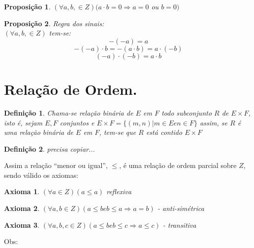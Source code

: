 \documentclass[a4paper,12pt]{article}
\newtheorem{prop}{Proposição}
\newtheorem{definit}{Definição}
\newtheorem{ax}{Axioma}
\begin{document}
\begin{prop} %
  $(\forall a, b, \in Z)(a \cdot b = 0 \Longrightarrow a = 0$ ou $b = 0)$
\end{prop}

\begin{prop} %
  Regra dos sinais:\\
  $(\forall a, b, \in Z)$ tem-se:\\
  \begin{equation} %
    -(-a) = a
  \end{equation}
  \begin{equation} %
    -(-a) \cdot b = -(a \cdot b) = a \cdot (-b)
  \end{equation}
  \begin{equation} %
    (-a) \cdot (-b) = a \cdot b
  \end{equation}
\end{prop}

\section{Relação de Ordem.}

\begin{definit}
 Chama-se relação binária de $E$ em $F$  todo subconjunto $R$ de $E \times F$, isto é, sejam $E, F$ conjuntos e $E \times F = \{(m, n) | m \in E e n \in F\}$ assim, se $R$ é uma relação binária de $E$ em $F$, tem-se que $R$ está contido  $ E \times F$ %
\end{definit}

\begin{definit}
 precisa copiar...
\end{definit}

Assim a relação ``menor ou igual'', $\leq$, é uma relação de ordem parcial sobre $Z$, sendo válido os axiomas:

\begin{ax}
  $(\forall  a \in Z)(a \leq a)$ reflexiva
\end{ax}
\begin{ax}
  $(\forall a, b \in Z)(a \leq b e b \leq a \Longrightarrow a = b)$ - anti-simétrica
\end{ax}
\begin{ax}
  $(\forall a, b, c \in Z)(a \leq b e b \leq c \Longrightarrow a \leq c)$ - transitiva
\end{ax}

Obs:
\end{document}
